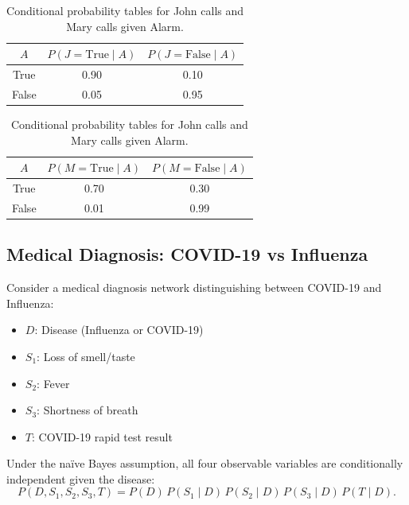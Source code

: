 \begin{table}[H]
\centering
\begin{tabular}{ccc}
\hline
$A$ & $P(J=\text{True}\mid A)$ & $P(J=\text{False}\mid A)$ \\\hline
True  & 0.90 & 0.10 \\
False & 0.05 & 0.95 \\\hline
\end{tabular}
\quad
\begin{tabular}{ccc}
\hline
$A$ & $P(M=\text{True}\mid A)$ & $P(M=\text{False}\mid A)$ \\\hline
True  & 0.70 & 0.30 \\
False & 0.01 & 0.99 \\\hline
\end{tabular}
\caption{Conditional probability tables for John calls and Mary calls given Alarm.}
\end{table}

\FloatBarrier

\subsection{Medical Diagnosis: COVID-19 vs Influenza}

Consider a medical diagnosis network distinguishing between COVID-19 and
Influenza:
\begin{itemize}
    \item $D$: Disease (Influenza or COVID-19)
    \item $S_1$: Loss of smell/taste
    \item $S_2$: Fever
    \item $S_3$: Shortness of breath
    \item $T$: COVID-19 rapid test result
\end{itemize}

Under the naïve Bayes assumption, all four observable variables are
conditionally independent given the disease:
\[
P(D,S_1,S_2,S_3,T) = P(D)\,P(S_1\mid D)\,P(S_2\mid D)\,P(S_3\mid D)\,P(T\mid D).
\]

